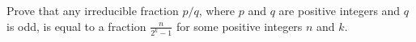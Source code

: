 Prove that any irreducible fraction $p/q$,  where $p$ and $q$ are positive integers and $q$ is odd, is equal to a fraction $\frac{n}{2^k-1}$ for some positive integers $n$ and $k$.